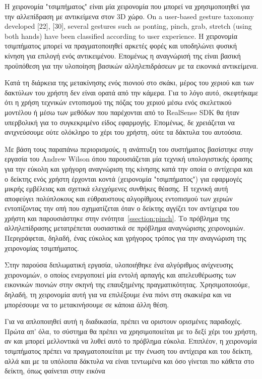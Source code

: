 Η χειρονομία "τσιμπήματος" είναι μία χειρονομία που μπορεί να χρησιμοποιηθεί για την αλλεπίδραση με αντικείμενα στον 3D χώρο. On a user-based gesture taxonomy developed [22], [30], several gestures such as ponting, pinch, grab, stretch (using both hands) have been classified according to user experience. Η χειρονομία τσιμπήματος μπορεί να πραγματοποιηθεί αρκετές φορές και υποδηλώνει φυσική κίνηση για επιλογή ενός αντικειμένου. Επομένως η αναγνώρισή της είναι βασική προϋπόθεση για την υλοποίηση βασικών αλληλεπιδράσεων με τα εικονικά αντικείμενα. 


Κατά τη διάρκεια της μετακίνησης ενός πιονιού στο σκάκι, μέρος του χεριού και των δακτύλων του χρήστη δεν είναι ορατά από την κάμερα. Για το λόγο αυτό, σκεφτήκαμε ότι η χρήση τεχνικών εντοπισμού της πόζας του χεριού μέσω ενός σκελετικού μοντέλου ή μέσω των μεθόδων που παρέχονται από το RealSense SDK θα ήταν υπερβολική για το συγκεκριμένο είδος εφαρμογής. Επομένως, δε χρειάζεται να ανιχνεύσουμε ούτε ολόκληρο το χέρι του χρήστη, ούτε τα δάκτυλα του αυτούσια. 





Με βάση τους παραπάνω περιορισμούς, η ανάπτυξη του συστήματος βασίστηκε στην εργασία του Andrew Wilson \cite{Wilson2006} όπου παρουσιάζεται μία τεχνική υπολογιστικής όρασης για την εύκολη και γρήγορη αναγνώριση της κίνησης κατά την οποία ο αντίχειρα και ο δείκτης ενός χρήστη έρχονται κοντά (χειρονομία "τσιμπήματος") για εφαρμογές μικρής εμβέλειας και σχετικά ελεγχόμενες συνθήκες θέασης. Η τεχνική αυτή αποφεύγει πολύπλοκους και εύθραυστους αλγορίθμους εντοπισμού των χεριών εντοπίζοντας την οπή που σχηματίζεται όταν ο δείκτης αγγίζει τον αντίχειρα του χρήστη και παρουσιάστηκε στην ενότητα~\ref{ssection:pinch}. Το πρόβλημα της αλληλεπίδρασης μετατρέπεται ουσιαστικά σε πρόβλημα αναγνώρισης χειρονομιών. Περιγράφεται, δηλαδή, ένας εύκολος και γρήγορος τρόπος για την αναγνώριση της χειρονομίας τσιμπήματος. 


Στην παρούσα διπλωματική εργασία, υλοποιήθηκε ένα αλγόριθμος ανίχνευσης χειρονομιών, ο οποίος ενεργοποιεί μία εντολή αρπαγής και απελευθέρωσης των εικονικών πιονιών στην σκηνή της επαυξημένης πραγματικότητας. Χρησιμοποιούμε, δηλαδή, τη χειρονομία αυτή για να επιλέξουμε ένα πιόνι στη σκακιέρα και να μπορέσουμε να το μετακινήσουμε σε κάποια άλλη θέση.


Για να απλοποιηθεί αυτή η διαδικασία, πρέπει να οριστουν ορισμένες παραδοχές.
Πρώτα απ' όλα, το σύστημα θα πρέπει να χρησιμοποιείται με το δεξί χέρι του χρήστη, αν και μπορεί μελλοντικά να λυθεί αυτό το πρόβλημα εύκολα. Επιπλέον, η χειρονομία τσιμπήματος πρέπει να πραγματοποιείται με την ένωση του αντίχειρα και του δείκτη, αλλά και με τα υπόλοιπα δάκτυλα να είναι τεντωμένα και όσο γίνεται πιο κάθετα στο δείκτη, όπως φαίνεται στην εικόνα 

